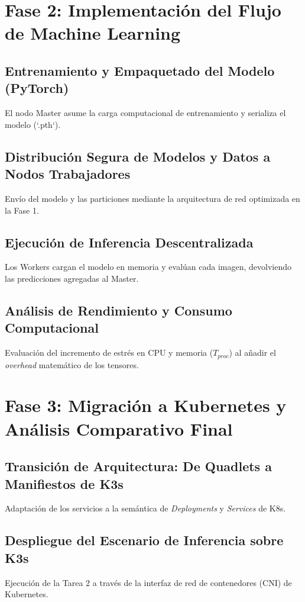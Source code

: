 \documentclass[11pt, a4paper]{report}
\begin{document}
\chapter{Fase 2: Implementación del Flujo de Machine Learning}

\section{Entrenamiento y Empaquetado del Modelo (PyTorch)}
El nodo Master asume la carga computacional de entrenamiento y serializa el modelo (`.pth`).

\section{Distribución Segura de Modelos y Datos a Nodos Trabajadores}
Envío del modelo y las particiones mediante la arquitectura de red optimizada en la Fase 1.

\section{Ejecución de Inferencia Descentralizada}
Los Workers cargan el modelo en memoria y evalúan cada imagen, devolviendo las predicciones agregadas al Master.

\section{Análisis de Rendimiento y Consumo Computacional}
Evaluación del incremento de estrés en CPU y memoria ($T_{proc}$) al añadir el \textit{overhead} matemático de los tensores.

\chapter{Fase 3: Migración a Kubernetes y Análisis Comparativo Final}

\section{Transición de Arquitectura: De Quadlets a Manifiestos de K3s}
Adaptación de los servicios a la semántica de \textit{Deployments} y \textit{Services} de K8s.

\section{Despliegue del Escenario de Inferencia sobre K3s}
Ejecución de la Tarea 2 a través de la interfaz de red de contenedores (CNI) de Kubernetes.
\end{document}
